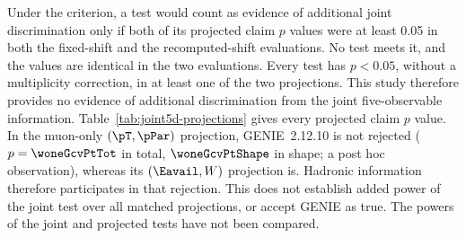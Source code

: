 Under the criterion, a test would count as evidence of additional joint discrimination only if both of its projected claim $p$ values were at least 0.05 in both the fixed-shift and the recomputed-shift evaluations. No test meets it, and the values are identical in the two evaluations. Every test has $p<0.05$, without a multiplicity correction, in at least one of the two projections. This study therefore provides no evidence of additional discrimination from the joint five-observable information. Table~\ref{tab:joint5d-projections} gives every projected claim $p$ value. In the muon-only $(\pT,\pPar)$ projection, GENIE~2.12.10 is not rejected ($p=\woneGcvPtTot$ in total, $\woneGcvPtShape$ in shape; a post hoc observation), whereas its $(\Eavail,W)$ projection is. Hadronic information therefore participates in that rejection. This does not establish added power of the joint test over all matched projections, or accept GENIE as true. The powers of the joint and projected tests have not been compared.

